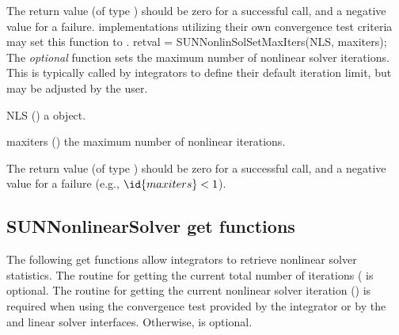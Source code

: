 {
  The return value  (of type ) should be zero for a
  successful call, and a negative value for a failure.
}
{
  {\sunnonlinsol} implementations utilizing their own convergence test
  criteria may set this function to .
}
{
  retval = SUNNonlinSolSetMaxIters(NLS, maxiters);
}
{
  The \textit{optional} function  sets the maximum
  number of nonlinear solver iterations. This is typically called by
  {\sundials} integrators to define their default iteration limit, but may be
  adjusted by the user.
}
{
  \begin{args}[maxiters]
  \item[NLS] ()
    a {\sunnonlinsol} object.
  \item[maxiters] ()
    the maximum number of nonlinear iterations.
  \end{args}
}
{
  The return value  (of type ) should be zero for a
  successful call, and a negative value for a failure
  (e.g., $\id{maxiters} < 1$).
}
{}


\subsection{SUNNonlinearSolver get functions}
\label{ss:sunnonlinsol_getfn}
The following get functions allow {\sundials} integrators to retrieve nonlinear
solver statistics. The routine for getting the current total number of
iterations ( is optional. The routine for getting
the current nonlinear solver iteration () is required
when using the convergence test provided by the {\sundials} integrator
or by the {\arkode} and {\cvode} linear solver interfaces.  Otherwise,
 is optional.

